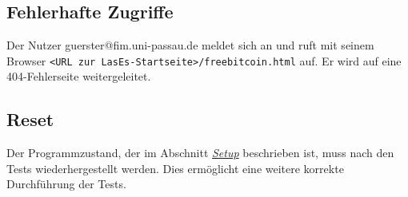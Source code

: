 \subsection{Fehlerhafte Zugriffe}

\begin{description}
	Der Nutzer guerster@fim.uni-passau.de meldet sich an und ruft mit seinem Browser \texttt{<URL zur LasEs-Startseite>/freebitcoin.html} auf.
	Er wird auf eine 404-Fehlerseite weitergeleitet.
\end{description}

\subsection{Reset}
Der Programmzustand, der im Abschnitt \emph{\hyperref[setup]{Setup}} beschrieben ist, muss nach den Tests wiederhergestellt werden.
Dies ermöglicht eine weitere korrekte Durchführung der Tests.




